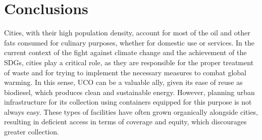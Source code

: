 \section{Conclusions}
\label{conclusions}
Cities, with their high population density, account for most of the oil and other fats consumed for culinary purposes, whether for domestic use or services. In the current context of the fight against climate change and the achievement of the SDGs, cities play a critical role, as they are responsible for the proper treatment of waste and for trying to implement the necessary measures to combat global warming. In this sense, UCO can be a valuable ally, given its ease of reuse as biodiesel, which produces clean and sustainable energy. However, planning urban infrastructure for its collection using containers equipped for this purpose is not always easy. These types of facilities have often grown organically alongside cities, resulting in deficient access in terms of coverage and equity, which discourages greater collection.

